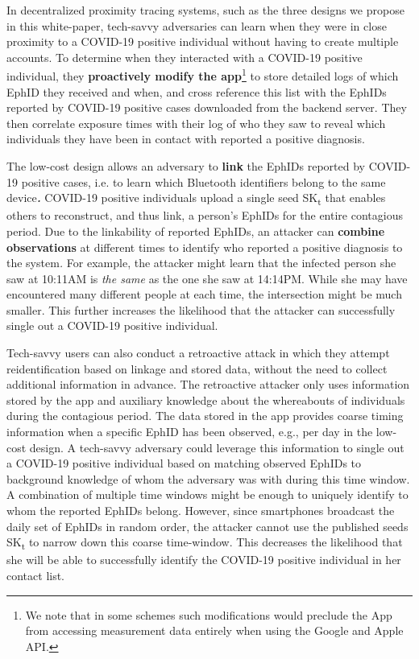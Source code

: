 \documentclass{article}
\begin{document}
In decentralized proximity tracing systems, such as the three designs we
propose in this white-paper, tech-savvy adversaries can learn when they
were in close proximity to a COVID-19 positive individual without having
to create multiple accounts. To determine when they interacted with a
COVID-19 positive individual, they \textbf{proactively modify the
app}\footnote{We note that in some schemes such modifications would
  preclude the App from accessing measurement data entirely when using
  the Google and Apple API.} to store detailed logs of which EphID they
received and when, and cross reference this list with the EphIDs
reported by COVID-19 positive cases downloaded from the backend server.
They then correlate exposure times with their log of who they saw to
reveal which individuals they have been in contact with reported a
positive diagnosis.

The low-cost design allows an adversary to \textbf{link} the EphIDs
reported by COVID-19 positive cases, i.e. to learn which Bluetooth
identifiers belong to the same device\emph{\textbf{.}} COVID-19 positive
individuals upload a single seed SK\textsubscript{t} that enables others
to reconstruct, and thus link, a person's EphIDs for the entire
contagious period. Due to the linkability of reported EphIDs, an
attacker can \textbf{combine observations} at different times to
identify who reported a positive diagnosis to the system\emph{.} For
example, the attacker might learn that the infected person she saw at
10:11AM is \emph{the same} as the one she saw at 14:14PM. While she may
have encountered many different people at each time, the intersection
might be much smaller. This further increases the likelihood that the
attacker can successfully single out a COVID-19 positive individual.

Tech-savvy users can also conduct a retroactive attack in which they
attempt reidentification based on linkage and stored data, without the
need to collect additional information in advance. The retroactive
attacker only uses information stored by the app and auxiliary knowledge
about the whereabouts of individuals during the contagious period. The
data stored in the app provides coarse timing information when a
specific EphID has been observed, e.g., per day in the low-cost design.
A tech-savvy adversary could leverage this information to single out a
COVID-19 positive individual based on matching observed EphIDs to
background knowledge of whom the adversary was with during this time
window. A combination of multiple time windows might be enough to
uniquely identify to whom the reported EphIDs belong. However, since
smartphones broadcast the daily set of EphIDs in random order, the
attacker cannot use the published seeds SK\textsubscript{t} to narrow
down this coarse time-window. This decreases the likelihood that she
will be able to successfully identify the COVID-19 positive individual
in her contact list.
\end{document}
